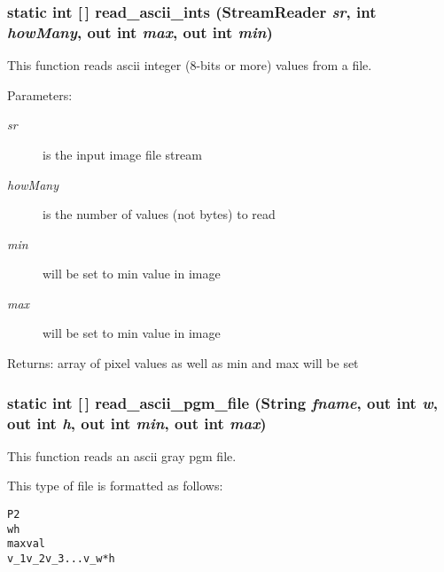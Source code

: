 \subsubsection{\setlength{\rightskip}{0pt plus 5cm}static int [$\,$] read\_\-ascii\_\-ints (Stream\-Reader {\em sr}, int {\em how\-Many}, out int {\em max}, out int {\em min})\hspace{0.3cm}{\tt  [static, protected]}}\label{class_c_s_image_viewer_1_1pnm_helper_74b6ea40f46549d20fb016cf9aea875f}


This function reads ascii integer (8-bits or more) values from a file. 

\begin{Desc}
\item[Parameters:]
\begin{description}
\item[{\em sr}]is the input image file stream \item[{\em how\-Many}]is the number of values (not bytes) to read \item[{\em min}]will be set to min value in image \item[{\em max}]will be set to min value in image\end{description}
\end{Desc}
\begin{Desc}
\item[Returns:]array of pixel values as well as min and max will be set \end{Desc}
\subsubsection{\setlength{\rightskip}{0pt plus 5cm}static int [$\,$] read\_\-ascii\_\-pgm\_\-file (String {\em fname}, out int {\em w}, out int {\em h}, out int {\em min}, out int {\em max})\hspace{0.3cm}{\tt  [static, protected]}}\label{class_c_s_image_viewer_1_1pnm_helper_3b60f3edcaf62c8e0d8e01383f7e0e32}


This function reads an ascii gray pgm file. 

This type of file is formatted as follows: \small\begin{alltt}
    P2
    w h
    maxval
    v\_1 v\_2 v\_3 . . . v\_w*h
  \end{alltt}\normalsize 


